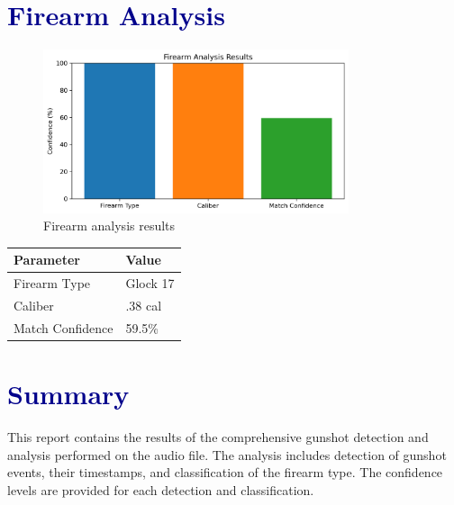 \documentclass{article}
\begin{document}
\section*{\textcolor{darkblue}{Firearm Analysis}}
\begin{figure}[h]
\centering
\includegraphics[width=0.8\textwidth]{firearm_analysis_20250428_233244.png}
\caption{Firearm analysis results}
\end{figure}
\begin{table}[h]
\centering
\begin{tabular}{ll}
\toprule
\textbf{Parameter} & \textbf{Value} \\
\midrule
Firearm Type & Glock 17 \\
Caliber & .38 cal \\
Match Confidence & 59.5\% \\
\bottomrule
\end{tabular}
\end{table}

\section*{\textcolor{darkblue}{Summary}}
This report contains the results of the comprehensive gunshot detection and analysis performed on the audio file. The analysis includes detection of gunshot events, their timestamps, and classification of the firearm type. The confidence levels are provided for each detection and classification.
\end{document}

